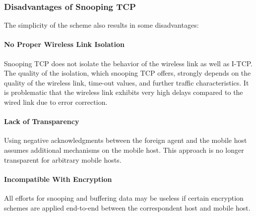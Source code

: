 \subsubsection[Disadvantages]{Disadvantages of Snooping TCP}
The simplicity of the scheme also results in some disadvantages:

\paragraph*{No Proper Wireless Link Isolation}
Snooping TCP does not isolate the behavior of the wireless link as well as I-TCP. The quality of the isolation, which snooping TCP offers, strongly depends on the quality of the wireless link, time-out values, and further traffic characteristics. It is problematic that the wireless link exhibits very high delays compared to the wired link due to error correction.


\paragraph*{Lack of Transparency}
Using negative acknowledgments between the foreign agent and the mobile host assumes additional mechanisms on the mobile host. This approach is no longer transparent for arbitrary mobile hosts.

\paragraph*{Incompatible With Encryption}
All efforts for snooping and buffering data may be useless if certain encryption schemes are applied end-to-end between the correspondent host and
mobile host. 


